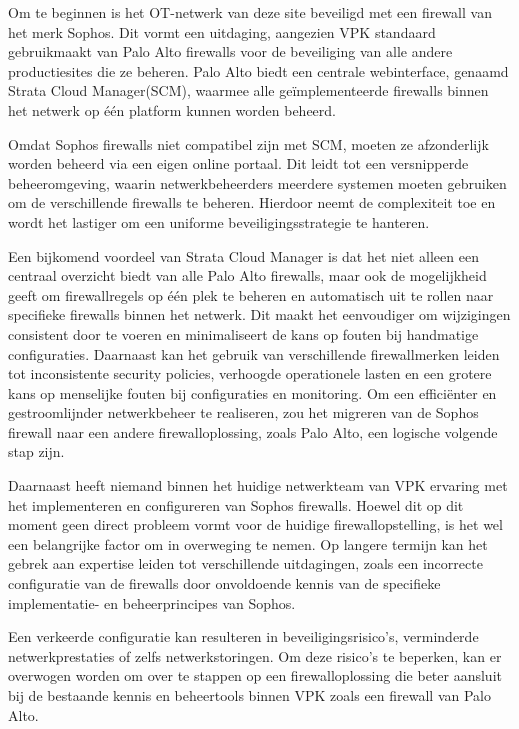 Om te beginnen is het OT-netwerk van deze site beveiligd met een firewall van het merk Sophos. Dit vormt een uitdaging, aangezien VPK standaard gebruikmaakt van Palo Alto firewalls voor de beveiliging van alle andere productiesites die ze beheren. Palo Alto biedt een centrale webinterface, genaamd Strata Cloud Manager(SCM), waarmee alle geïmplementeerde firewalls binnen het netwerk op één platform kunnen worden beheerd.

Omdat Sophos firewalls niet compatibel zijn met SCM, moeten ze afzonderlijk worden beheerd via een eigen online portaal. Dit leidt tot een versnipperde beheeromgeving, waarin netwerkbeheerders meerdere systemen moeten gebruiken om de verschillende firewalls te beheren. Hierdoor neemt de complexiteit toe en wordt het lastiger om een uniforme beveiligingsstrategie te hanteren.

Een bijkomend voordeel van Strata Cloud Manager is dat het niet alleen een centraal overzicht biedt van alle Palo Alto firewalls, maar ook de mogelijkheid geeft om firewallregels op één plek te beheren en automatisch uit te rollen naar specifieke firewalls binnen het netwerk. Dit maakt het eenvoudiger om wijzigingen consistent door te voeren en minimaliseert de kans op fouten bij handmatige configuraties.
Daarnaast kan het gebruik van verschillende firewallmerken leiden tot inconsistente security policies, verhoogde operationele lasten en een grotere kans op menselijke fouten bij configuraties en monitoring. Om een efficiënter en gestroomlijnder netwerkbeheer te realiseren, zou het migreren van de Sophos firewall naar een andere firewalloplossing, zoals Palo Alto, een logische volgende stap zijn.

Daarnaast heeft niemand binnen het huidige netwerkteam van VPK ervaring met het implementeren en configureren van Sophos firewalls. Hoewel dit op dit moment geen direct probleem vormt voor de huidige firewallopstelling, is het wel een belangrijke factor om in overweging te nemen. Op langere termijn kan het gebrek aan expertise leiden tot verschillende uitdagingen, zoals een incorrecte configuratie van de firewalls door onvoldoende kennis van de specifieke implementatie- en beheerprincipes van Sophos.

Een verkeerde configuratie kan resulteren in beveiligingsrisico’s, verminderde netwerkprestaties of zelfs netwerkstoringen. Om deze risico’s te beperken, kan er overwogen worden om over te stappen op een firewalloplossing die beter aansluit bij de bestaande kennis en beheertools binnen VPK zoals een firewall van Palo Alto.\newline

